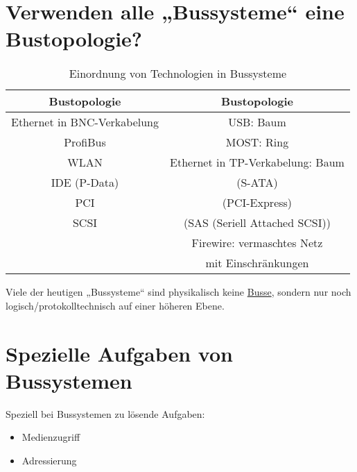 \section{Verwenden alle „Bussysteme“ eine Bustopologie?}
\begin{table}[h]
\centering
\begin{tabular}{c|c}
\textbf{Bustopologie} & \textbf{Bustopologie} \\ 
\hline 
Ethernet in BNC-Verkabelung & USB: Baum \\ 
\hline 
ProfiBus & MOST: Ring \\ 
\hline 
WLAN & Ethernet in TP-Verkabelung: Baum \\ 
\hline
IDE (P-Data) & (S-ATA)\\
\hline
PCI & (PCI-Express)\\
\hline
SCSI & (SAS (Seriell Attached SCSI))\\
\hline
 & Firewire: vermaschtes Netz\\
 & mit Einschränkungen
\end{tabular}
\caption{Einordnung von Technologien in Bussysteme}
\label{tab:bussystem_or_not}
\end{table} 
Viele der heutigen „Bussysteme“ sind physikalisch keine \underline{Busse}, sondern nur noch logisch/protokolltechnisch auf einer höheren Ebene.



\section{Spezielle Aufgaben von Bussystemen}
\label{sec:spezielle_Aufgaben_Bussysteme}
Speziell bei Bussystemen zu lösende Aufgaben:
\begin{itemize}
\item Medienzugriff
\item Adressierung
\end{itemize}
